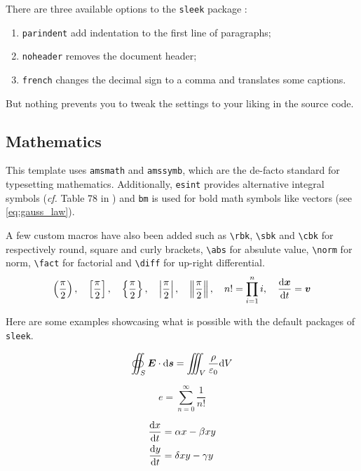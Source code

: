 \documentclass[a4paper, 12pt]{report}
\def\tbs{\textbackslash}
\begin{document}
    There are three available options to the \texttt{sleek} package :

    \begin{enumerate}[noitemsep]
        \item \texttt{parindent} add indentation to the first line of paragraphs;
        \item \texttt{noheader} removes the document header;
        \item \texttt{french} changes the decimal sign to a comma and translates some captions.
    \end{enumerate}

    But nothing prevents you to tweak the settings to your liking in the source code.

    \subsection{Mathematics}

    This template uses \texttt{amsmath} and \texttt{amssymb}, which are the de-facto standard for typesetting mathematics. Additionally, \texttt{esint} provides alternative integral symbols (\emph{cf.} Table 78 in \cite{pakin2020comprehensive}) and \texttt{bm} is used for bold math symbols like vectors (see \eqref{eq:gauss_law}).

    A few custom macros have also been added such as \texttt{\tbs{}rbk}, \texttt{\tbs{}sbk} and \texttt{\tbs{}cbk} for respectively round, square and curly brackets, \texttt{\tbs{}abs} for absulute value, \texttt{\tbs{}norm} for norm, \texttt{\tbs{}fact} for factorial and \texttt{\tbs{}diff} for up-right differential.
    $$
        \left(\frac{\pi}{2}\right), \quad \left[\frac{\pi}{2}\right], \quad \left\{\frac{\pi}{2}\right\}, \quad \left|\frac{\pi}{2}\right|, \quad \left\|\frac{\pi}{2}\right\|, \quad n! = \prod_{i = 1}^{n} i, \quad \frac{\mathrm{d} \bm{x}}{\mathrm{d} t} = \bm{v}
    $$

    Here are some examples showcasing what is possible with the default packages of \texttt{sleek}.

    \begin{equation}\label{eq:gauss_law}
        \oiint_S \bm{E} \cdot \mathrm{d} \bm{s} = \iiint_V \frac{\rho}{\varepsilon_0} \mathrm{d} V
    \end{equation}

    \begin{equation*}
        e = \sum_{n=0}^\infty \frac{1}{n!}
    \end{equation*}

    \begin{subequations}
        \begin{align}
            \frac{\mathrm{d} x}{\mathrm{d} t} & = \alpha x - \beta xy \\
            \frac{\mathrm{d} y}{\mathrm{d} t} & = \delta xy - \gamma y
        \end{align}
    \end{subequations}
\end{document}

